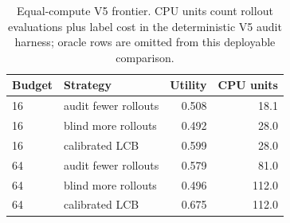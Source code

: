 \begin{table}[t]
\centering
\small
\begin{tabular}{llrr}
\toprule
Budget & Strategy & Utility & CPU units \\
\midrule
16 & audit fewer rollouts & 0.508 & 18.1 \\
16 & blind more rollouts & 0.492 & 28.0 \\
16 & calibrated LCB & 0.599 & 28.0 \\
64 & audit fewer rollouts & 0.579 & 81.0 \\
64 & blind more rollouts & 0.496 & 112.0 \\
64 & calibrated LCB & 0.675 & 112.0 \\
\bottomrule
\end{tabular}
\caption{Equal-compute V5 frontier. CPU units count rollout evaluations plus label cost in the deterministic V5 audit harness; oracle rows are omitted from this deployable comparison.}
\label{tab:v5-compute-frontier}
\end{table}
